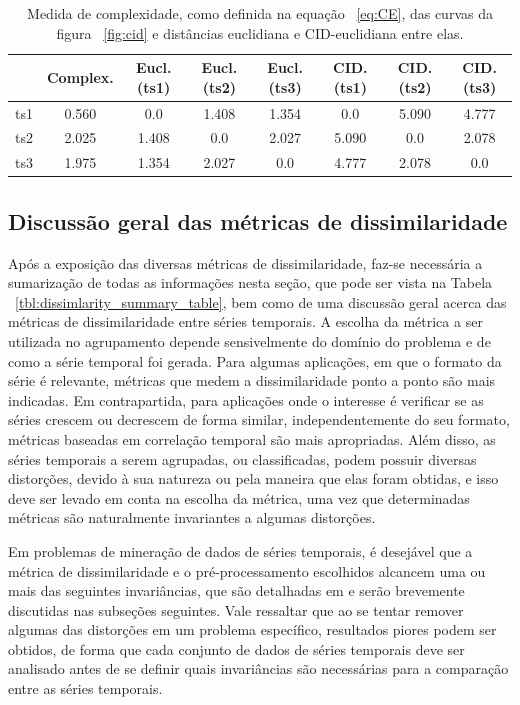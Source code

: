 \begin{table}[!h]
	\centering
	\caption{Medida de complexidade, como definida na equação ~\ref{eq:CE}, das curvas da figura ~\ref{fig:cid} e distâncias euclidiana e CID-euclidiana entre elas.}
	\label{cid_table}
	\begin{tabular}{c|c|ccc|ccc}
		\toprule
		& Complex.  & Eucl.(ts1)   & Eucl.(ts2)   &Eucl.(ts3)  & CID.(ts1)   & CID.(ts2)   &CID.(ts3) \\
		\midrule

ts1 & 0.560 & 0.0 & 1.408 & 1.354 & 0.0 & 5.090 & 4.777\\
ts2 & 2.025 & 1.408 & 0.0 & 2.027 & 5.090 & 0.0  & 2.078\\		
ts3 & 1.975 & 1.354 & 2.027 & 0.0 & 4.777 & 2.078  & 0.0\\
		\bottomrule
	\end{tabular}
\end{table}

\subsection{Discussão geral das métricas de dissimilaridade}

Após a exposição das diversas métricas de dissimilaridade, faz-se necessária a sumarização de todas as informações nesta seção, que pode ser vista na Tabela ~\ref{tbl:dissimlarity_summary_table}, bem como de uma discussão geral acerca das métricas de dissimilaridade entre séries temporais. A escolha da métrica a ser utilizada no agrupamento depende sensivelmente do domínio do problema e de como a série temporal foi gerada. Para algumas aplicações, em que o formato da série é relevante, métricas que medem a dissimilaridade ponto a ponto são mais indicadas. Em contrapartida, para aplicações onde o interesse é verificar se as séries crescem ou decrescem de forma similar, independentemente do seu formato, métricas baseadas em correlação temporal são mais apropriadas. Além disso, as séries temporais a serem agrupadas, ou classificadas, podem possuir diversas distorções, devido à sua natureza ou pela maneira que elas foram obtidas, e isso deve ser levado em conta na escolha da métrica, uma vez que determinadas métricas são naturalmente invariantes a algumas distorções.

Em problemas de mineração de dados de séries temporais, é desejável que a métrica de dissimilaridade e o pré-processamento escolhidos alcancem uma ou mais das seguintes invariâncias, que são detalhadas em \parencite{CID} e serão brevemente discutidas nas subseções seguintes. Vale ressaltar que ao se tentar remover algumas das distorções em um problema específico, resultados piores podem ser obtidos, de forma que cada conjunto de dados de séries temporais deve ser analisado antes de se definir quais invariâncias são necessárias para a comparação entre as séries temporais.

